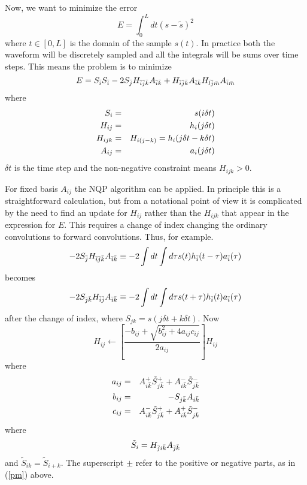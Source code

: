 \documentclass[11pt,twocolumn]{IEEEtran}
\begin{document}
Now, we want to minimize the error
\begin{equation}
E=\int_0^L dt(s-\tilde{s})^2
\end{equation}
where $t\in [0,L]$ is the domain of the sample $s(t)$. In practice
both the waveform will be discretely sampled and all the integrals
will be sums over time steps. This means the problem is to minimize
\begin{equation}
E=S_{\bar{i}} S_{\bar{i}}-2S_{\bar{j}} H_{{\bar{i}}{\bar{j}}{\bar{k}}}A_{{\bar{i}}{\bar{k}}}+H_{{\bar{i}}{\bar{j}}{\bar{k}}}A_{{\bar{i}}{\bar{k}}}H_{{\bar{l}}{\bar{j}}{\bar{m}}}A_{{\bar{i}}{\bar{m}}}
\end{equation}
where 
\begin{eqnarray}
S_i&=&s(i\delta t)\cr
H_{ij}&=&h_i(j\delta t)\cr
H_{ijk}&=&H_{i(j-k)}=h_i(j\delta t - k\delta t)\cr
A_{ij}&=&a_i(j\delta t)
\end{eqnarray}
$\delta t$ is the time step and the non-negative constraint means $H_{ijk}>0$.

For fixed basis $A_{ij}$ the NQP algorithm can be applied. In
principle this is a straightforward calculation, but from a notational
point of view it is complicated by the need to find an update for
$H_{ij}$ rather than the $H_{ijk}$ that appear in the expression for
$E$.  This requires a change of index changing the ordinary
convolutions to forward convolutions. Thus, for example.
\begin{equation}
-2S_{\bar{j}} H_{{\bar{i}}{\bar{j}}{\bar{k}}}A_{{\bar{i}}{\bar{k}}}\equiv -2\int dt\int d\tau s(t)h_{\bar{i}}(t-\tau)a_{\bar{i}}(\tau)
\end{equation}
becomes 
\begin{equation}
-2S_{{\bar{j}}{\bar{k}}} H_{{\bar{i}}{\bar{j}}}A_{{\bar{i}}{\bar{k}}}\equiv -2\int dt\int d\tau s(t+\tau)h_{\bar{i}}(t)a_{\bar{i}}(\tau)
\end{equation}
after the change of index, where $S_{jk}=s(j\delta t+k \delta t)$. Now
\begin{equation}
H_{ij}\leftarrow\left[\frac{-b_{ij}+\sqrt{b_{ij}^2+4a_{ij}c_{ij}}}{2a_{ij}}\right]H_{ij}
\end{equation}
where 
\begin{eqnarray}
a_{ij}&=& A^+_{i{\bar{k}}}\tilde{S}^+_{j{\bar{k}}}+A^-_{i{\bar{k}}}\tilde{S}^-_{j{\bar{k}}}\cr
b_{ij}&=&-S_{j{\bar{k}}}A_{i{\bar{k}}} \cr
c_{ij}&=& A^-_{i{\bar{k}}}\tilde{S}^+_{j{\bar{k}}}+A^+_{i{\bar{k}}}\tilde{S}^-_{j{\bar{k}}}
\label{abc}
\end{eqnarray}
where 
\begin{equation}
\tilde{S}_{i}=H_{{\bar{j}} i {\bar{k}}}A_{{\bar{j}} {\bar{k}}}
\end{equation}
and $\tilde{S}_{ik}=\tilde{S}_{i+k}$. The superscript $\pm$ refer to the positive or negative parts, as in (\ref{pm}) above.
\end{document}
